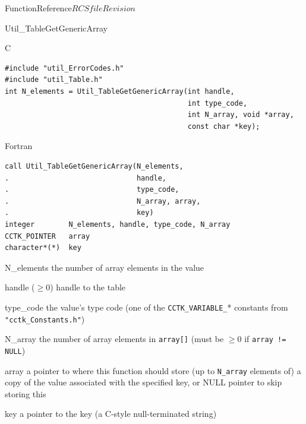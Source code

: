 \begin{cactuspart}{FunctionReference}{$RCSfile$}{$Revision$}
\begin{FunctionDescription}{Util\_TableGetGenericArray}
\begin{SynopsisSection}
\begin{Synopsis}{C}
\begin{verbatim}
#include "util_ErrorCodes.h"
#include "util_Table.h"
int N_elements = Util_TableGetGenericArray(int handle,
                                           int type_code,
                                           int N_array, void *array,
                                           const char *key);
\end{verbatim}
\end{Synopsis}
\begin{Synopsis}{Fortran}
\begin{verbatim}
call Util_TableGetGenericArray(N_elements,
.                              handle,
.                              type_code,
.                              N_array, array,
.                              key)
integer        N_elements, handle, type_code, N_array
CCTK_POINTER   array
character*(*)  key
\end{verbatim}
\end{Synopsis}
\end{SynopsisSection}

\begin{ResultSection}
\begin{Result}{N\_elements}
the number of array elements in the value
\end{Result}
\end{ResultSection}

\begin{ParameterSection}
\begin{Parameter}{handle ($\ge 0$)}
handle to the table
\end{Parameter}
\begin{Parameter}{type\_code}
the value's type code
(one of the \verb|CCTK_VARIABLE_|* constants from \verb|"cctk_Constants.h"|)
\end{Parameter}
\begin{Parameter}{N\_array}
the number of array elements in \verb|array[]|
(must be $\ge 0$ if \verb|array != NULL|)
\end{Parameter}
\begin{Parameter}{array}
a pointer to where this function should store (up to \verb|N_array|
elements of) a copy of the value associated with the specified key,
or NULL pointer to skip storing this
\end{Parameter}
\begin{Parameter}{key}
a pointer to the key (a C-style null-terminated string)
\end{Parameter}
\end{ParameterSection}


\end{FunctionDescription}
\end{cactuspart}
